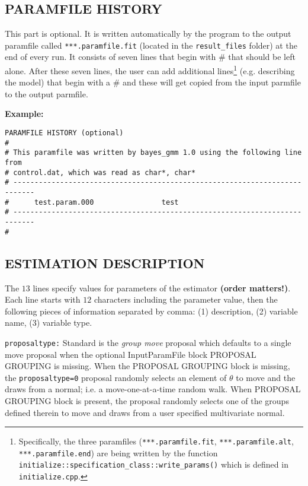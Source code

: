 \documentclass[11pt, letterpaper, notitlepage]{article}
\begin{document}
\subsection{PARAMFILE HISTORY}

This part is optional. It is written automatically by the program to the output paramfile called \texttt{***.paramfile.fit} (located in the \texttt{result\_files} folder) at the end of every run. It consists of seven lines that begin with \# that should be left alone. After these seven lines, the user can add additional lines\footnote{Specifically, the three paramfiles (\texttt{***.paramfile.fit}, \texttt{***.paramfile.alt}, \texttt{***.paramfile.end}) are being written by the function \texttt{initialize::specification\_class::write\_params()} which is defined in \texttt{initialize.cpp}.} (e.g. describing the model) that begin with a \# and these will get copied from the input parmfile to the output parmfile.  

\textbf{Example:}

\begin{verbatim}
PARAMFILE HISTORY (optional)
#
# This paramfile was written by bayes_gmm 1.0 using the following line from
# control.dat, which was read as char*, char*
# ---------------------------------------------------------------------------
#      test.param.000                test
# ---------------------------------------------------------------------------
#
\end{verbatim}

\subsection{ESTIMATION DESCRIPTION}

The $13$ lines specify values for parameters of the estimator \textbf{(order matters!)}. Each line starts with $12$ characters including the parameter value, then the following pieces of information separated by comma: (1) description, (2) variable name, (3) variable type. 


\texttt{proposaltype:} Standard is the \emph{group move} proposal which defaults to a single move proposal when the optional InputParamFile block PROPOSAL GROUPING is missing. When the PROPOSAL GROUPING block is missing, the \texttt{proposaltype=0} proposal randomly selects an element of $\theta$ to move and the draws from a normal; i.e. a move-one-at-a-time random walk. When PROPOSAL GROUPING block is present, the proposal randomly selects one of the groups defined therein to move and draws from a user specified multivariate normal. 
\end{document}
